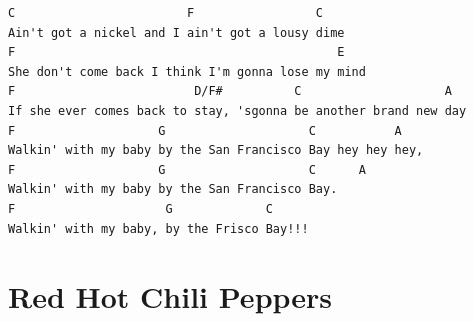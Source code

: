 \documentclass[a4paper]{article}
\begin{document}
\begin{Verbatim}[commandchars=\\\{\}]
C                        F                 C
Ain't got a nickel and I ain't got a lousy dime
F                                             E
She don't come back I think I'm gonna lose my mind
F                         D/F#          C                    A
If she ever comes back to stay, 'sgonna be another brand new day
F                    G                    C           A
Walkin' with my baby by the San Francisco Bay hey hey hey,
F                    G                    C      A
Walkin' with my baby by the San Francisco Bay. 
F                     G             C
Walkin' with my baby, by the Frisco Bay!!!
\end{Verbatim}
\newpage
\section{Red Hot Chili Peppers} %
\label{sec:Red Hot Chili Peppers}
\end{document}

